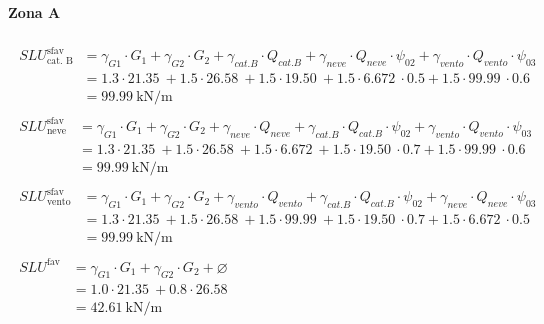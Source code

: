 \paragraph*{Zona A}
\allowdisplaybreaks %
\begin{align} 
	\begin{split}
	SLU^{\text{sfav}}_{\text{cat. B}} &= \gamma_{G1}\cdot G_1 + \gamma_{G2} \cdot G_2 + \gamma_{cat. B} \cdot Q_{cat. B} + \gamma_{neve}\cdot Q_{neve}\cdot\psi_{02} + \gamma_{vento}\cdot Q_{vento} \cdot \psi_{03}  \\
	&= 1.3\cdot\SI{21.35}{} + 1.5\cdot\SI{26.58}{} + 1.5\cdot\SI{19.50}{} + 1.5\cdot\SI{6.672}{}\cdot0.5 + 1.5\cdot\SI{99.99}{}\cdot0.6\\
	&= \SI{99.99}{\kilo\newton\per\meter}
	\end{split} \\ 
	\begin{split}
	SLU^{\text{sfav}}_{\text{neve}} &= \gamma_{G1}\cdot G_1 + \gamma_{G2} \cdot G_2 + \gamma_{neve}\cdot Q_{neve} + \gamma_{cat. B} \cdot Q_{cat. B}\cdot\psi_{02} + \gamma_{vento}\cdot Q_{vento} \cdot \psi_{03}  \\
	&= 1.3\cdot\SI{21.35}{} + 1.5\cdot\SI{26.58}{} + 1.5\cdot\SI{6.672}{} + 1.5\cdot\SI{19.50}{}\cdot0.7 + 1.5\cdot\SI{99.99}{}\cdot0.6\\
	&= \SI{99.99}{\kilo\newton\per\meter}
	\end{split} \\ 
	\begin{split}
	SLU^{\text{sfav}}_{\text{vento}} &= \gamma_{G1}\cdot G_1 + \gamma_{G2} \cdot G_2 + \gamma_{vento}\cdot Q_{vento} + \gamma_{cat. B} \cdot Q_{cat. B}\cdot\psi_{02} + \gamma_{neve}\cdot Q_{neve} \cdot \psi_{03}  \\
	&= 1.3\cdot\SI{21.35}{} + 1.5\cdot\SI{26.58}{} + 1.5\cdot\SI{99.99}{} + 1.5\cdot\SI{19.50}{}\cdot0.7 + 1.5\cdot\SI{6.672}{}\cdot0.5\\
	&= \SI{99.99}{\kilo\newton\per\meter}
	\end{split} \\ 
	\begin{split}
	SLU^{\text{fav}} &= \gamma_{G1}\cdot G_1 + \gamma_{G2} \cdot G_2 + \varnothing\\
	&= 1.0\cdot\SI{21.35}{} + 0.8\cdot\SI{26.58}{}\\
	&= \SI{42.61}{\kilo\newton\per\meter}	
	\end{split} \\ 

\end{align}
